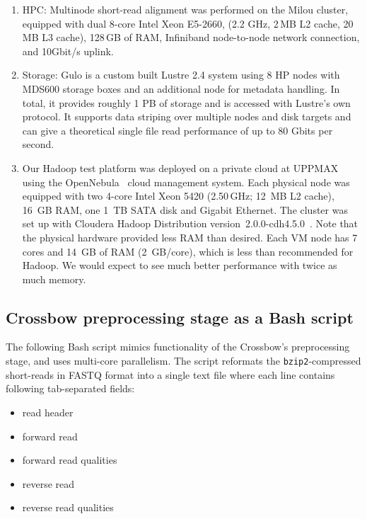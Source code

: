 \documentclass[10pt]{article}
\begin{document}
\begin{enumerate}

\item 
HPC:
Multinode short-read alignment was performed on the Milou cluster\cite{milouCluster}, equipped with dual 8-core Intel Xeon E5-2660, (2.2 GHz, 2\,MB L2 cache, 20\,MB L3 cache), 128\,GB of RAM, Infiniband node-to-node network connection, and 10Gbit/s uplink.

\item Storage: 
Gulo\cite{gulo} is a custom built Lustre 2.4 system using 8 HP nodes with MDS600
storage boxes and an additional node for metadata handling. In total, it
provides roughly 1 PB of storage and is accessed with Lustre's own protocol. It
supports data striping over multiple nodes and disk targets and can give a
theoretical single file read performance of up to 80 Gbits per second.

\item Our Hadoop test platform was deployed on a private cloud at UPPMAX using
	the OpenNebula~\cite{opennebula} cloud management system. Each physical node
	was equipped with two 4-core Intel Xeon 5420 (2.50\,GHz; 12~MB L2 cache),
	16~GB RAM, one 1~TB SATA disk and Gigabit Ethernet. The cluster was set up
	with Cloudera Hadoop Distribution version~2.0.0-cdh4.5.0~\cite{cloudera}.
	Note that the physical hardware provided less RAM than desired. Each VM node
	has 7 cores and 14~GB of RAM (2~GB/core), which is less than recommended for
	Hadoop. We would expect to see much better performance with twice as much memory.
\end{enumerate}


\subsection*{Crossbow preprocessing stage as a Bash script}

The following Bash script mimics functionality of the Crossbow's preprocessing stage,
and uses multi-core parallelism. The script reformats the
\texttt{bzip2}-compressed short-reads in FASTQ format into a single text file
where each line contains following tab-separated fields:
\begin{itemize}
\item read header
\item forward read
\item forward read qualities
\item reverse read
\item reverse read qualities
\end{itemize}
\end{document}
